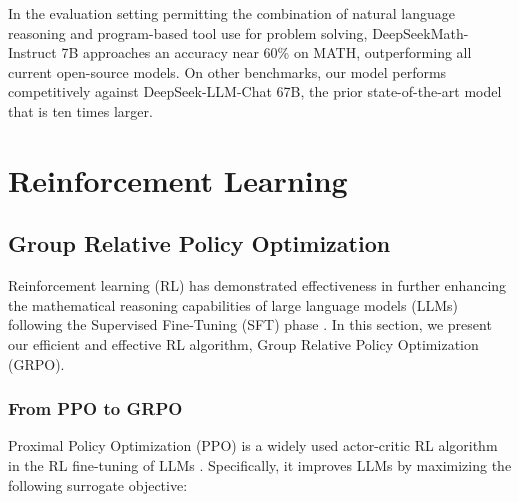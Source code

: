 In the evaluation setting permitting the combination of natural language reasoning and program-based tool use for problem solving, DeepSeekMath-Instruct 7B approaches an accuracy near 60\% on MATH, outperforming all current open-source models. On other benchmarks, our model performs competitively against DeepSeek-LLM-Chat 67B, the prior state-of-the-art model that is ten times larger.

\section{Reinforcement Learning}

\subsection{Group Relative Policy Optimization} Reinforcement learning (RL) has demonstrated effectiveness in further enhancing the mathematical reasoning capabilities of large language models (LLMs) following the Supervised Fine-Tuning (SFT) phase \citep{wang2023math,wizardmath}. In this section, we present our efficient and effective RL algorithm, Group Relative Policy Optimization (GRPO).

\subsubsection{From PPO to GRPO} Proximal Policy Optimization (PPO) \citep{schulman2017proximal} is a widely used actor-critic RL algorithm in the RL fine-tuning of LLMs \citep{ouyang2022training}. Specifically, it improves LLMs by maximizing the following surrogate objective:

